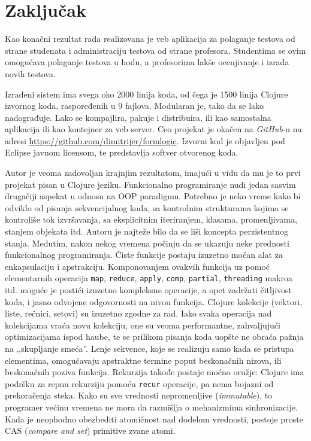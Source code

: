 \chapter{Zaključak}\label{zakljucak}
Kao konačni rezultat rada realizovana je veb aplikacija za polaganje testova od strane studenata i administraciju testova od strane profesora. Studentima se ovim omogućava polaganje testova u hodu, a profesorima lakše ocenjivanje i izrada novih testova.

Izrađeni sistem ima svega oko 2000 linija koda, od čega je 1500 linija Clojure izvornog koda, raspoređenih u 9 fajlova. Modularan je, tako da se lako nadograđuje. Lako se kompajlira, pakuje i distribuira, ili kao samostalna aplikacija ili kao kontejner za veb server. Ceo projekat je okačen na \textit{GitHub}-u na adresi \url{https://github.com/dimitrijer/formlogic}. Izvorni kod je objavljen pod Eclipse javnom licensom, te predstavlja softver otvorenog koda.

Autor je veoma zadovoljan krajnjim rezultatom, imajući u vidu da mu je to prvi projekat pisan u Clojure jeziku. Funkcionalno programiranje nudi jedan sasvim drugačiji aspekat u odnosu na OOP paradigmu. Potrebno je neko vreme kako bi odviklo od pisanja sekvencijalnog koda, sa kontrolnim strukturama kojima se kontroliše tok izvršavanja, sa eksplicitnim iteriranjem, klasama, promenljivama, stanjem objekata itd. Autoru je najteže bilo da se liši koncepta perzistentnog stanja. Međutim, nakon nekog vremena počinju da se ukazuju neke prednosti funkcionalnog programiranja. Čiste funkcije postaju izuzetno moćan alat za enkapsulaciju i apstrakciju. Komponovanjem ovakvih funkcija uz pomoć elementarnih operacija \texttt{map}, \texttt{reduce}, \texttt{apply}, \texttt{comp}, \texttt{partial}, \texttt{threading} makroa itd. moguće je postići izuzetno kompleksne operacije, a opet zadržati čitljivost koda, i jasno odvojene odgovornosti na nivou funkcija. Clojure kolekcije (vektori, liste, rečnici, setovi) su izuzetno zgodne za rad. Iako svaka operacija nad kolekcijama vraća novu kolekciju, one su veoma performantne, zahvaljujući optimizacijama ispod haube, te se prilikom pisanja koda uopšte ne obraća pažnja na ,,skupljanje smeća''. Lenje sekvence, koje se realizuju samo kada se pristupa elementima, omogućavaju apstraktne termine poput beskonačnih nizova, ili beskonačnih poziva funkcija. Rekurzija takođe postaje moćno oružje: Clojure ima podršku za repnu rekurziju pomoću \texttt{recur} operacije, pa nema bojazni od prekoračenja steka. Kako su sve vrednosti nepromenljive (\textit{immutable}), to programer većinu vremena ne mora da razmišlja o mehanizmima sinhronizacije. Kada je neophodno obezbediti atomičnost nad dodelom vrednosti, postoje proste CAS (\textit{compare and set}) primitive zvane atomi.

